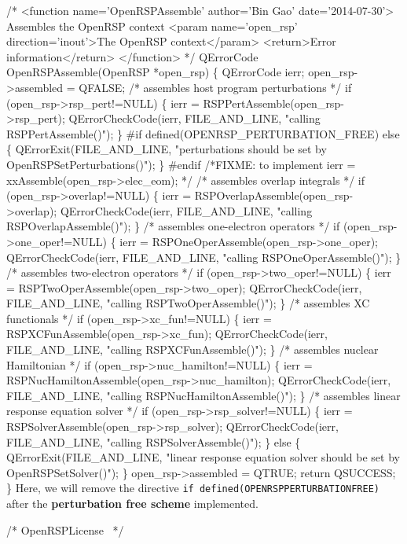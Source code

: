 /* <function name='OpenRSPAssemble' author='Bin Gao' date='2014-07-30'>
     Assembles the OpenRSP context
     <param name='open_rsp' direction='inout'>The OpenRSP context</param>
     <return>Error information</return>
   </function> */
QErrorCode OpenRSPAssemble(OpenRSP *open_rsp)
\{
    QErrorCode ierr;
    open_rsp->assembled = QFALSE;
    /* assembles host program perturbations */
    if (open_rsp->rsp_pert!=NULL) \{
        ierr = RSPPertAssemble(open_rsp->rsp_pert);
        QErrorCheckCode(ierr, FILE_AND_LINE, "calling RSPPertAssemble()");
    \}
#if defined(OPENRSP_PERTURBATION_FREE)
    else \{
        QErrorExit(FILE_AND_LINE, "perturbations should be set by OpenRSPSetPerturbations()");
    \}
#endif
/*FIXME: to implement ierr = xxAssemble(open_rsp->elec_eom); */
    /* assembles overlap integrals */
    if (open_rsp->overlap!=NULL) \{
        ierr = RSPOverlapAssemble(open_rsp->overlap);
        QErrorCheckCode(ierr, FILE_AND_LINE, "calling RSPOverlapAssemble()");
    \}
    /* assembles one-electron operators */
    if (open_rsp->one_oper!=NULL) \{
        ierr = RSPOneOperAssemble(open_rsp->one_oper);
        QErrorCheckCode(ierr, FILE_AND_LINE, "calling RSPOneOperAssemble()");
    \}
    /* assembles two-electron operators */
    if (open_rsp->two_oper!=NULL) \{
        ierr = RSPTwoOperAssemble(open_rsp->two_oper);
        QErrorCheckCode(ierr, FILE_AND_LINE, "calling RSPTwoOperAssemble()");
    \}
    /* assembles XC functionals */
    if (open_rsp->xc_fun!=NULL) \{
        ierr = RSPXCFunAssemble(open_rsp->xc_fun);
        QErrorCheckCode(ierr, FILE_AND_LINE, "calling RSPXCFunAssemble()");
    \}
    /* assembles nuclear Hamiltonian */
    if (open_rsp->nuc_hamilton!=NULL) \{
        ierr = RSPNucHamiltonAssemble(open_rsp->nuc_hamilton);
        QErrorCheckCode(ierr, FILE_AND_LINE, "calling RSPNucHamiltonAssemble()");
    \}
    /* assembles linear response equation solver */
    if (open_rsp->rsp_solver!=NULL) \{
        ierr = RSPSolverAssemble(open_rsp->rsp_solver);
        QErrorCheckCode(ierr, FILE_AND_LINE, "calling RSPSolverAssemble()");
    \}
    else \{
        QErrorExit(FILE_AND_LINE, "linear response equation solver should be set by OpenRSPSetSolver()");
    \}
    open_rsp->assembled = QTRUE;
    return QSUCCESS;
\}
\nwendcode{}Here, we will remove the directive {\tt{}{}if\ defined(OPENRSP{}PERTURBATION{}FREE)}
after the \textbf{perturbation free scheme} implemented.

\nwenddocs{}\endmoddef
/*
  \LA{}OpenRSPLicense~{\nwtagstyle{}}\RA{}
*/

